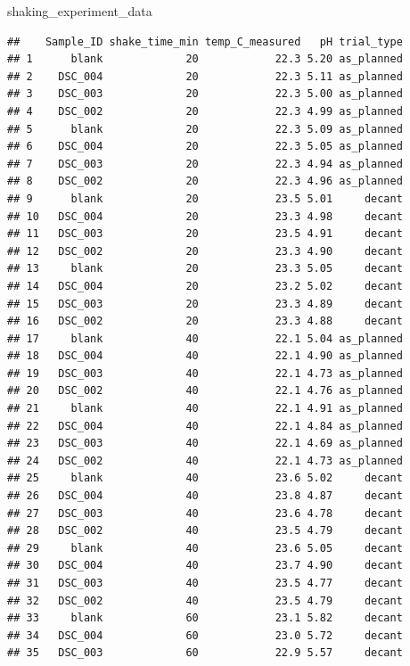 \documentclass[
]{article}
\newenvironment{Shaded}{\begin{snugshade}}{\end{snugshade}}
\newcommand{\NormalTok}[1]{#1}
\begin{document}
\begin{Shaded}
\begin{Highlighting}[]
\NormalTok{shaking\_experiment\_data}
\end{Highlighting}
\end{Shaded}

\begin{verbatim}
##    Sample_ID shake_time_min temp_C_measured   pH trial_type
## 1      blank             20            22.3 5.20 as_planned
## 2    DSC_004             20            22.3 5.11 as_planned
## 3    DSC_003             20            22.3 5.00 as_planned
## 4    DSC_002             20            22.3 4.99 as_planned
## 5      blank             20            22.3 5.09 as_planned
## 6    DSC_004             20            22.3 5.05 as_planned
## 7    DSC_003             20            22.3 4.94 as_planned
## 8    DSC_002             20            22.3 4.96 as_planned
## 9      blank             20            23.5 5.01     decant
## 10   DSC_004             20            23.3 4.98     decant
## 11   DSC_003             20            23.5 4.91     decant
## 12   DSC_002             20            23.3 4.90     decant
## 13     blank             20            23.3 5.05     decant
## 14   DSC_004             20            23.2 5.02     decant
## 15   DSC_003             20            23.3 4.89     decant
## 16   DSC_002             20            23.3 4.88     decant
## 17     blank             40            22.1 5.04 as_planned
## 18   DSC_004             40            22.1 4.90 as_planned
## 19   DSC_003             40            22.1 4.73 as_planned
## 20   DSC_002             40            22.1 4.76 as_planned
## 21     blank             40            22.1 4.91 as_planned
## 22   DSC_004             40            22.1 4.84 as_planned
## 23   DSC_003             40            22.1 4.69 as_planned
## 24   DSC_002             40            22.1 4.73 as_planned
## 25     blank             40            23.6 5.02     decant
## 26   DSC_004             40            23.8 4.87     decant
## 27   DSC_003             40            23.6 4.78     decant
## 28   DSC_002             40            23.5 4.79     decant
## 29     blank             40            23.6 5.05     decant
## 30   DSC_004             40            23.7 4.90     decant
## 31   DSC_003             40            23.5 4.77     decant
## 32   DSC_002             40            23.5 4.79     decant
## 33     blank             60            23.1 5.82     decant
## 34   DSC_004             60            23.0 5.72     decant
## 35   DSC_003             60            22.9 5.57     decant

\end{verbatim}
\end{document}
